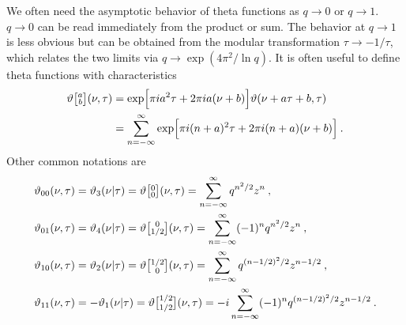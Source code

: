 We often need the asymptotic behavior of theta functions as $q \rightarrow 0$ or $q \rightarrow 1$. $q \rightarrow 0$ can be read immediately from the product or sum. The behavior at $q \rightarrow 1$ is less obvious but can be obtained from the modular transformation $\tau \rightarrow-1 / \tau$, which relates the two limits via $q \rightarrow \exp \left(4 \pi^{2} / \ln q\right)$. 
It is often useful to define theta functions with characteristics 
\begin{align}
	\vartheta\bigl[\!\begin{smallmatrix} a\\b\end{smallmatrix}\!\bigr]
	(\nu, \tau) &=\exp \Bigl[\pi i a^{2} \tau+2 \pi i a(\nu+b)\Bigr] \vartheta(\nu+a \tau+b, \tau)  \nonumber \\
	&=\sum_{n=-\infty}^{\infty} \exp \Bigl[\pi i(n+a)^{2} \tau+2 \pi i(n+a)(\nu+b)\Bigr] \:. \label{7.2.36} 
\end{align}
Other common notations are 
\begin{subequations} \label{7.2.37}
	\begin{align}
		\vartheta_{00}(\nu, \tau)&=\vartheta_{3}(\nu \vert \tau)= 
		\vartheta\bigl[\!\begin{smallmatrix} 0\\0\end{smallmatrix}\!\bigr](\nu, \tau) = \sum_{n=-\infty}^{\infty} q^{n^{2} / 2} z^{n} \:, 
		\label{7.2.37a}  \\
		\vartheta_{01}(\nu, \tau) &= \vartheta_{4}(\nu \vert \tau)=
		\vartheta\bigl[\!\begin{smallmatrix} 0\\1/2\end{smallmatrix}\!\bigr](\nu, \tau)=
		\sum_{n=-\infty}^{\infty}(-1)^{n} q^{n^{2} / 2} z^{n} \:, \label{7.2.37b}\\
		\vartheta_{10}(\nu, \tau) &= \vartheta_{2}(\nu \vert \tau) = 
		\vartheta\bigl[\!\begin{smallmatrix} 1/2\\0\end{smallmatrix}\!\bigr](\nu, \tau)
		=\sum_{n=-\infty}^{\infty} q^{(n-1 / 2)^{2} / 2} z^{n-1 / 2}  \:, \label{7.2.37c} \\
		\vartheta_{11}(\nu, \tau)&=-\vartheta_{1}(\nu \vert \tau) = 
		\vartheta\bigl[\!\begin{smallmatrix} 1/2\\1/2\end{smallmatrix}\!\bigr](\nu, \tau)
		=-\mi \sum_{n=-\infty}^{\infty}(-1)^{n} q^{(n-1 / 2)^{2} / 2} z^{n-1 / 2} \:. \label{7.2.37d} 
	\end{align}
\end{subequations}

